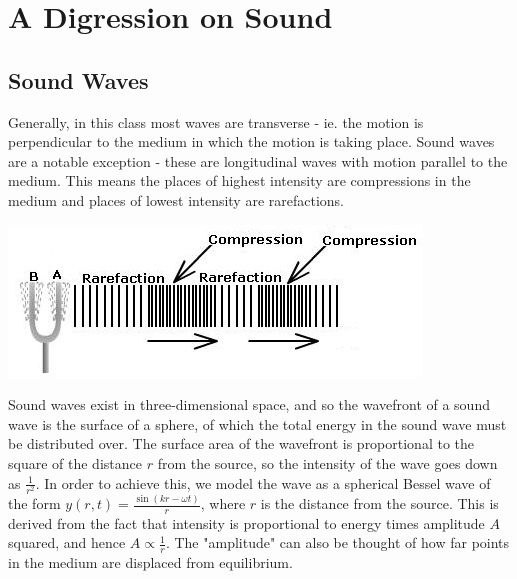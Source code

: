 \section{A Digression on Sound}
\subsection{Sound Waves}
Generally, in this class most waves are transverse - ie. the motion is perpendicular to the medium in which the motion is taking place. Sound waves are a notable exception - these are longitudinal waves with motion parallel to the medium. This means the places of highest intensity are compressions in the medium and places of lowest intensity are rarefactions.
\begin{center}
	\includegraphics[scale=1.5]{images/waves/soundwaves.jpg}\\
\end{center}
Sound waves exist in three-dimensional space, and so the wavefront of a sound wave is the surface of a sphere, of which the total energy in the sound wave must be distributed over. The surface area of the wavefront is proportional to the square of the distance $r$ from the source, so the intensity of the wave goes down as $\frac{1}{r^2}$. In order to achieve this, we model the wave as a spherical Bessel wave of the form $y(r, t) = \frac{\sin(kr-\omega t)}{r}$, where $r$ is the distance from the source. This is derived from the fact that intensity is proportional to energy times amplitude $A$ squared, and hence $A \propto \frac{1}{r}$. The "amplitude" can also be thought of how far points in the medium are displaced from equilibrium.
